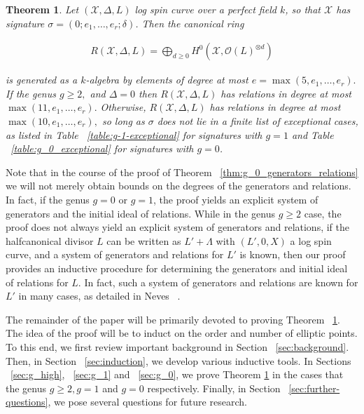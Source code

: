 \documentclass{amsart}
\theoremstyle{plain}
\newtheorem{thm}{Theorem}[section]
\theoremstyle{definition}
\theoremstyle{remark}
\numberwithin{equation}{section}
\newcommand \sx{\mathscr X}
\newcommand\sco{{\mathscr O}}
\newcommand \halfcan{L}
\begin{document}
\begin{thm}
\label{thm:general_generators_relations}
Let $(\sx, \Delta, \halfcan)$ log spin curve over a perfect field $k$, so
that $\sx$ has signature $\sigma = (0; e_1, \ldots, e_r; \delta)$. Then the
canonical ring

\begin{align*}
	R(\sx, \Delta, \halfcan) = \bigoplus_{d \geq 0} H^0(\sx, \sco(L)^{\otimes d})
\end{align*}

\noindent
is generated as a $k$-algebra by elements of degree at most $e =
\max(5, e_1, \ldots, e_r).$ If the genus $g \geq 2,$ and $\Delta = 0$ then 
$R(\sx,\Delta, \halfcan)$ has relations in degree at most $\max(11, e_1,
\ldots, e_r).$ Otherwise, $R(\sx, \Delta, \halfcan)$ has relations in degree at most
$\max(10, e_1, \ldots, e_r),$ so long as $\sigma$ does not lie in a finite list of
exceptional cases, as listed in Table ~\ref{table:g-1-exceptional}
for signatures with $g = 1$ and Table ~\ref{table:g_0_exceptional}
for signatures with $g = 0$.
\end{thm}
Note that in the course of the proof of Theorem ~\ref{thm:g_0_generators_relations} we will not merely obtain bounds on the degrees of the generators and relations. In fact, if the genus $g = 0$ or $g = 1$, the proof yields an explicit system of generators and the initial ideal of relations. While in the genus $g \geq 2$ case, the proof does not always yield an explicit system of generators and relations, if the halfcanonical divisor $\halfcan$ can be written as $\halfcan' + \Lambda$ with $(\halfcan',0,X)$ a log spin curve, and a system of generators and relations for $\halfcan'$ is known, then our proof provides an inductive procedure for determining the generators and initial ideal of relations for $\halfcan$. In fact, such a system of generators and relations are known for $\halfcan'$ in many cases, as detailed in Neves ~\cite[Section III.4]{neves:halfcan}.



The remainder of the paper will be primarily devoted to proving Theorem ~\ref{thm:general_generators_relations}. The idea of the proof will be to induct on the order and number of elliptic points. To this end, we first review important background in Section ~\ref{sec:background}. Then, in Section ~\ref{sec:induction}, we develop various inductive tools. In Sections ~\ref{sec:g_high}, ~\ref{sec:g_1} and ~\ref{sec:g_0}, we prove Theorem \ref{thm:general_generators_relations} in the cases that the genus $g \geq 2, g = 1$ and $g = 0$ respectively. Finally, in Section ~\ref{sec:further-questions}, we pose several questions for future research.
\end{document}
